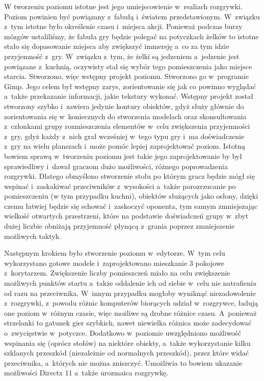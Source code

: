 W tworzeniu poziomu istotne jest jego umiejscowienie w~realiach rozgrywki. Poziom powinien być powiązany z~fabułą i~światem przedstawionym. W~związku z~tym istotne było określenie czasu i~miejsca akcji. Ponieważ podczas burzy mózgów ustaliliśmy, że fabuła gry będzie polegać na potyczkach żelków to istotne stało się dopasowanie miejsca aby zwiększyć immersję a~co za tym idzie przyjemność z~gry. W~związku z~tym, że żelki są jedzeniem a~jedzenie jest powiązane z~kuchnią, oczywisty stał się wybór tego pomieszczenia jako miejsce starcia. Stworzono, więc wstępny projekt poziomu. Stworzono go w~programie Gimp. Jego celem był wstępny zarys, zorientowanie się jak co powinno wyglądać a~także przekazanie informacji, jakie tekstury wykonać. Wstępny projekt został stworzony szybko i~zawiera jedynie kontury obiektów, gdyż służy głównie do zorientowania się w~koniecznych do stworzenia modelach oraz skonsultowania z~członkami grupy rozmieszczenia elementów w~celu zwiększenia przyjemności z~gry, gdyż każdy z~nich grał wcześniej w~tego typu gry i~ma doświadczenie z~gry na wielu planszach i~może pomóc lepiej zaprojektować poziom. Istotną bowiem sprawą w~tworzeniu poziomu jest takie jego zaprojektowanie by był sprawiedliwy i~dawał graczom dużo możliwości, różnego poprowadzenia rozgrywki. Dlatego obmyślono stworzenie stołu po którym gracz będzie mógł się wspinać i~zaskakiwać przeciwników z~wysokości a~także porozrzucanie po pomieszczeniu (w tym przypadku kuchni), obiektów służących jako osłony, dzięki czemu łatwiej będzie się schować i~zaskoczyć oponenta, tym samym zmniejszając wielkość otwartych przestrzeni, które na podstawie doświadczeń grupy w~zbyt dużej liczbie obniżają przyjemność płynącą z~grania poprzez zmniejszenie możliwych taktyk.

Następnym krokiem było stworzenie poziomu w~edytorze. W~tym celu wykorzystano gotowe modele i~zaprojektowano mieszkanie 3 pokojowe z~korytarzem. Zwiększenie liczby pomieszczeń miało na celu zwiększenie możliwych punktów startu a~także oddalenie ich od siebie w~celu nie natrafienia od razu na przeciwnika. W~innym przypadku mogłoby wyniknąć niezadowolenie z~rozgrywki, z~powodu różnic komputerów biorących udział w~rozgrywce, ładują one poziom w~różnym czasie, więc możliwe są drobne różnice czasu. A~ponieważ strzelanki to gatunek gier szybkich, nawet niewielka różnica może zadecydować o~zwycięstwie w~potyczce. Dodatkowo w~poziomie uwzględniono możliwość wspinania się (oprócz stołów) na niektóre obiekty, a~także wykorzystanie kilku szklanych przeszkód (niezależnie od normalnych przeszkód), przez które widać przeciwnika, a~których nie można zniszczyć. Umożliwia to bowiem ukazanie możliwości Directx 11 a~także urozmaica rozgrywkę.

